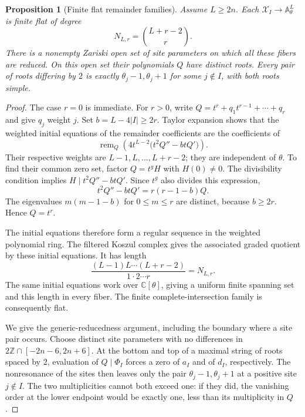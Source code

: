 \documentclass[11pt]{article}
\newtheorem{proposition}{Proposition}[section]
\theoremstyle{definition}
\newcommand{\A}{\mathbb A}
\newcommand{\C}{\mathbb C}
\begin{document}
\begin{proposition}[Finite flat remainder families]
\label{prop:geometric-remainder-flatness}
Assume $L\ge2n$. Each $\mathcal X_I\to\A^L_\theta$ is finite
flat of degree
\[
 N_{L,r}=\binom{L+r-2}{r}.
\]
There is a nonempty Zariski open set of site parameters on which all
these fibers are reduced. On this open set their polynomials $Q$
have distinct roots. Every pair of roots differing by $2$ is exactly
$\theta_j-1,\theta_j+1$ for some $j\notin I$, with both roots simple.
\end{proposition}

\begin{proof}
The case $r=0$ is immediate. For $r>0$, write
$Q=t^r+q_1t^{r-1}+\cdots+q_r$ and give $q_j$ weight $j$.
Set $b=L-4|I|\ge2r$. Taylor expansion shows that the weighted
initial equations of the remainder coefficients are the coefficients of
\[
 \operatorname{rem}_Q\left(4t^{L-2}
               \bigl(t^2Q''-btQ'\bigr)\right).
\]
Their respective weights are $L-1,L,\ldots,L+r-2$; they are
independent of $\theta$. To find their common zero set, factor
$Q=t^gH$ with $H(0)\ne0$. The divisibility condition implies
$H\mid t^2Q''-btQ'$. Since $t^g$ also divides this expression,
\[
 t^2Q''-btQ'=r(r-1-b)Q.
\]
The eigenvalues $m(m-1-b)$ for $0\le m\le r$ are distinct,
because $b\ge2r$. Hence $Q=t^r$.

The initial equations therefore form a regular sequence in the
weighted polynomial ring. The filtered Koszul complex gives the
associated graded quotient by these initial equations. It has length
\[
 \frac{(L-1)L\cdots(L+r-2)}{1\cdot2\cdots r}
 =N_{L,r}.
\]
The same initial equations work over $\C[\theta]$, giving a
uniform finite spanning set and this length in every fiber. The
finite complete-intersection family is consequently flat.

We give the generic-reducedness argument, including the boundary
where a site pair occurs. Choose distinct site parameters with no
differences in $2\mathbb Z\cap[-2n-6,2n+6]$. At the bottom and
top of a maximal string of roots spaced by $2$, evaluation of
$Q\mid\Phi_I$ forces a zero of
$a_I$ and of $d_I$, respectively. The nonresonance of the sites
then leaves only the pair $\theta_j-1,\theta_j+1$ at a positive
site $j\notin I$. The two multiplicities cannot both exceed one:
if they did, the vanishing order at the lower endpoint would be exactly
one, less than its multiplicity in $Q$.


\end{proof}
\end{document}
